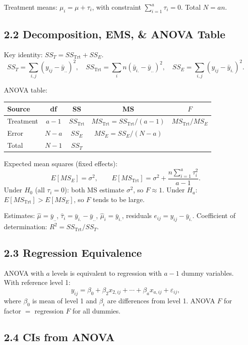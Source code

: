 \documentclass[9pt,letterpaper]{article}
\begin{document}
Treatment means: $\mu_i=\mu+\tau_i$, with constraint $\sum_{i=1}^a \tau_i=0$. Total $N=an$.

\subsection{2.2 Decomposition, EMS, \& ANOVA Table}

Key identity: $SS_T = SS_{\text{Trt}} + SS_E$.
\[
SS_T=\sum_{i,j}(y_{ij}-\bar{y}_{..})^2,\quad SS_{\text{Trt}}=\sum_i n(\bar{y}_{i.}-\bar{y}_{..})^2,\quad SS_E=\sum_{i,j}(y_{ij}-\bar{y}_{i.})^2.
\]

ANOVA table:
\begin{center}\small
\begin{tabular}{@{}lcccc@{}}
\toprule
Source & df & SS & MS & $F$ \\
\midrule
Treatment & $a-1$ & $SS_{\text{Trt}}$ & $MS_{\text{Trt}}=SS_{\text{Trt}}/(a-1)$ & $MS_{\text{Trt}}/MS_E$ \\
Error & $N-a$ & $SS_E$ & $MS_E=SS_E/(N-a)$ & \\
Total & $N-1$ & $SS_T$ & & \\
\bottomrule
\end{tabular}
\end{center}

Expected mean squares (fixed effects):
\[
E[MS_E]=\sigma^2,\qquad E[MS_{\text{Trt}}]=\sigma^2+\frac{n\sum_{i=1}^a \tau_i^2}{a-1}.
\]
Under $H_0$ (all $\tau_i=0$): both MS estimate $\sigma^2$, so $F\approx1$. Under $H_a$: $E[MS_{\text{Trt}}]>E[MS_E]$, so $F$ tends to be large.

Estimates: $\hat{\mu}=\bar{y}_{..}$, $\hat{\tau}_i=\bar{y}_{i.}-\bar{y}_{..}$, $\hat{\mu}_i=\bar{y}_{i.}$, residuals $e_{ij}=y_{ij}-\bar{y}_{i.}$. Coefficient of determination: $R^2=SS_{\text{Trt}}/SS_T$.

\subsection{2.3 Regression Equivalence}

ANOVA with $a$ levels is equivalent to regression with $a-1$ dummy variables. With reference level 1:
\[
y_{ij}=\beta_0+\beta_2x_{2,ij}+\cdots+\beta_a x_{a,ij}+\varepsilon_{ij},
\]
where $\beta_0$ is mean of level 1 and $\beta_i$ are differences from level 1. ANOVA $F$ for factor $=$ regression $F$ for all dummies.

\subsection{2.4 CIs from ANOVA}
\end{document}
